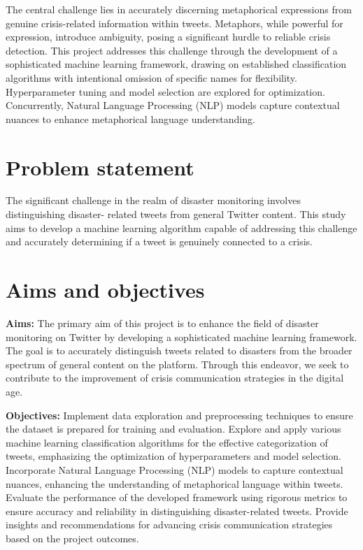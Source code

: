 The central challenge lies in accurately discerning metaphorical expressions from genuine 
crisis-related information within tweets. Metaphors, while powerful for expression, introduce 
ambiguity, posing a significant hurdle to reliable crisis detection. This project addresses 
this challenge through the development of a sophisticated machine learning framework, drawing 
on established classification algorithms with intentional omission of specific names for 
flexibility. Hyperparameter tuning and model selection are explored for optimization. 
Concurrently, Natural Language Processing (NLP) models capture contextual nuances to enhance 
metaphorical language understanding.


\section{Problem statement}
\label{sec:intro_prob_art}

The significant challenge in the realm of disaster monitoring involves distinguishing disaster-
related tweets from general Twitter content. This study aims to develop a machine learning 
algorithm capable of addressing this challenge and accurately determining if a tweet is 
genuinely connected to a crisis.

\section{Aims and objectives}
\label{sec:intro_aims_obj} 

 
  \textbf{Aims:}
The primary aim of this project is to enhance the field of disaster monitoring on Twitter by 
developing a sophisticated machine learning framework. The goal is to accurately distinguish 
tweets related to disasters from the broader spectrum of general content on the platform. 
Through this endeavor, we seek to contribute to the improvement of crisis communication 
strategies in the digital age.

\textbf{Objectives:} Implement data exploration and preprocessing techniques to ensure the 
dataset is prepared for training and evaluation.
Explore and apply various machine learning classification algorithms for the effective 
categorization of tweets, emphasizing the optimization of hyperparameters and model selection.
Incorporate Natural Language Processing (NLP) models to capture contextual nuances, enhancing 
the understanding of metaphorical language within tweets.
Evaluate the performance of the developed framework using rigorous metrics to ensure accuracy 
and reliability in distinguishing disaster-related tweets.
Provide insights and recommendations for advancing crisis communication strategies based on the 
project outcomes.


